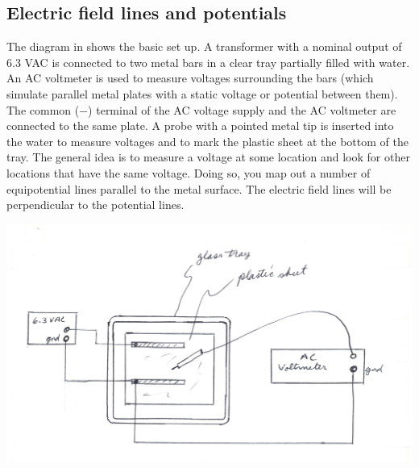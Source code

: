 \begin{multicols}{2}
\section{Electric field lines and potentials}
The diagram in  shows the basic set up.  A transformer with a nominal output of 6.3 VAC is connected to two metal bars in a clear tray partially filled with water.  An AC voltmeter is used to measure voltages surrounding the bars (which simulate parallel metal plates with a static voltage or potential between them).  The common ($-$) terminal of the AC voltage supply and the AC voltmeter are connected to the same plate.  A probe with a pointed metal tip is inserted into the water to measure voltages and to mark the plastic sheet at the bottom of the tray.  The general idea is to measure a voltage at some location and look for other locations that have the same voltage.  Doing so, you map out a number of equipotential lines parallel to the metal surface. The electric field lines will be perpendicular to the potential lines.

\begin{center}
	\includegraphics[scale=0.6]{5bgraf/fig_1}
	\label{f:fig1}
\end{center}


\end{multicols}
